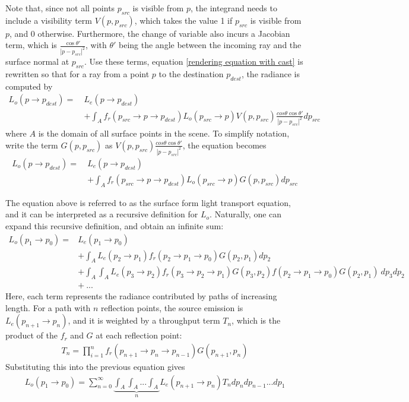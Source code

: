 Note that, since not all points $p_{src}$ is visible from $p$, the integrand needs to include a visibility term $V(p,p_{src})$, which takes the value 1 if $p_{src}$ is visible from $p$, and 0 otherwise. Furthermore, the change of variable also incurs a Jacobian term, which is $\frac{\cos\theta'}{|p-p_{src}|^2}$, with $\theta'$ being the angle between the incoming ray and the surface normal at $p_{src}$. Use these terms, equation \ref{rendering equation with cast} is rewritten so that for a ray from a point $p$ to the destination $p_{dest}$, the radiance is computed by
\begin{align*}
    L_o(p\to p_{dest}) =~ &L_e(p\to p_{dest}) \\
    &+ \int_A f_r(p_{src}\to p\to p_{dest}) L_o(p_{src}\to p)  V(p,p_{src}) \frac{cos\theta\cos\theta'}{|p-p_{src}|^2} d p_{src}
\end{align*} 
where $A$ is the domain of all surface points in the scene. To simplify notation, write the term $G(p,p_{src})$ as $V(p,p_{src}) \frac{cos\theta\cos\theta'}{|p-p_{src}|^2}$, the equation becomes
\begin{align*}
    L_o(p\to p_{dest}) =~ &L_e(p\to p_{dest}) \\
    &+ \int_A f_r(p_{src}\to p\to p_{dest}) L_o(p_{src}\to p)  G(p,p_{src})  d p_{src}
\end{align*} 

The equation above is referred to as the surface form light transport equation, and it can be interpreted as a recursive definition for $L_o$. Naturally, one can expand this recursive definition, and obtain an infinite sum:
\begin{align*}
    L_o(p_1\to p_0) =
    &L_e(p_1\to p_0)\\
    &+ \int_A L_e(p_2\to p_1)f_r(p_2\to p_1\to p_0)G(p_2,p_1) dp_2\\
    &+ \int_A \int_A L_e(p_3\to p_2)f_r(p_3\to p_2\to p_1) G(p_3,p_2)f(p_2\to p_1\to p_0)G(p_2,p_1) ~ dp_3dp_2\\
    &+~...
\end{align*}
Here, each term represents the radiance contributed by paths of increasing length. For a path with $n$ reflection points, the source emission is $L_e(p_{n+1}\to p_{n})$, and it is weighted by a throughput term $T_n$, which is the product of the $f_r$ and $G$ at each reflection point:
\begin{align*}
    T_n = \prod_{i=1}^{n} f_r(p_{n+1}\to p_n\to p_{n-1})G(p_{n+1},p_n)
\end{align*}
Substituting this into the previous equation gives
\begin{align*}
    L_o(p_1\to p_0) = \sum_{n=0}^{\infty} \underbrace{\int_A \int_A...\int_A}_{n} L_e(p_{n+1}\to p_{n})T_n dp_{n}dp_{n-1}...dp_1
\end{align*}


